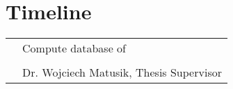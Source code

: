 \newpage
\section{Timeline}
\begin{tabular} {L{3cm} L{10cm}}
  & Compute database of\\
     &\\
  & Dr. Wojciech Matusik, Thesis Supervisor
\end{tabular}